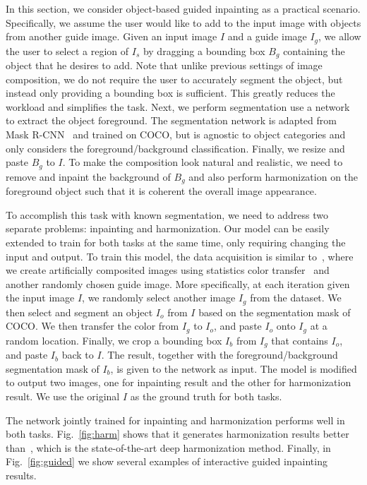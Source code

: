 In this section, we consider object-based guided inpainting as a practical scenario. Specifically, we assume the user would like to add to the input image with objects from another guide image. Given an input image $I$ and a guide image $I_g$, we allow the user to select a region of $I_s$ by dragging a bounding box $B_g$ containing the object that he desires to add. Note that unlike previous settings of image composition, we do not require the user to accurately segment the object, but instead only providing a bounding box is sufficient. This greatly reduces the workload and simplifies the task. Next, we perform segmentation use a network to extract the object foreground. The segmentation network is adapted from Mask R-CNN~\cite{he2017mask} and trained on COCO, but is agnostic to object categories and only considers the foreground/background classification. Finally, we resize and paste $B_g$ to $I$. To make the composition look natural and realistic, we need to remove and inpaint the background of $B_g$ and also perform harmonization on the foreground object such that it is coherent the overall image appearance.   

To accomplish this task with known segmentation, we need to address two separate problems: inpainting and harmonization. Our model can be easily extended to train for both tasks at the same time, only requiring changing the input and output. To train this model, the data acquisition is similar to~\cite{tsai2017deep}, where we create artificially composited images using statistics color transfer~\cite{reinhard2001color} and another randomly chosen guide image. More specifically, at each iteration given the input image $I$, we randomly select another image $I_g$ from the dataset. We then select and segment an object $I_o$ from $I$ based on the segmentation mask of COCO. We then transfer the color from $I_g$ to $I_o$, and paste $I_o$ onto $I_g$ at a random location. Finally, we crop a bounding box $I_b$ from $I_g$ that contains $I_o$, and paste $I_b$ back to $I$. The result, together with the foreground/background segmentation mask of $I_b$, is given to the network as input. The model is modified to output two images, one for inpainting result and the other for harmonization result. We use the original $I$ as the ground truth for both tasks. 

The network jointly trained for inpainting and harmonization performs well in both tasks. Fig.~\ref{fig:harm} shows that it generates harmonization results better than~\cite{tsai2017deep}, which is the state-of-the-art deep harmonization method. Finally, in Fig.~\ref{fig:guided} we show several examples of interactive guided inpainting results.

